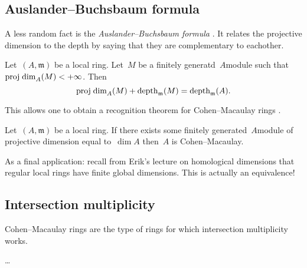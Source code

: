 \documentclass[10pt,a4paper]{article}
\begin{document}
\subsection{Auslander--Buchsbaum formula}
A less random fact is the \emph{Auslander--Buchsbaum formula} \cite[theorem 19.9]{eisenbud-commutative-algebra}. It relates the projective dimension to the depth by saying that they are complementary to eachother.
\begin{theorem}
  Let~$(A,\mathfrak{m})$ be a local ring. Let~$M$ be a finitely generatd~$A$\dash module such that~$\operatorname{proj\;dim}_A(M)<+\infty$. Then
  \begin{equation}
    \operatorname{proj\;dim}_A(M)+\operatorname{depth}_{\mathfrak{m}}(M)=\operatorname{depth}_{\mathfrak{m}}(A).
  \end{equation}
\end{theorem}
This allows one to obtain a recognition theorem for Cohen--Macaulay rings \cite[corollary 19.10]{eisenbud-commutative-algebra}.
\begin{corollary}
  Let~$(A,\mathfrak{m})$ be a local ring. If there exists some finitely generated~$A$\dash module of projective dimension equal to~$\dim A$ then~$A$ is Cohen--Macaulay.
\end{corollary}
As a final application: recall from Erik's lecture on homological dimensions that regular local rings have finite global dimensions. This is actually an equivalence! 

\subsection{Intersection multiplicity}
Cohen--Macaulay rings are the type of rings for which intersection multiplicity works.
\begin{example}
  \ldots
\end{example}
\end{document}
